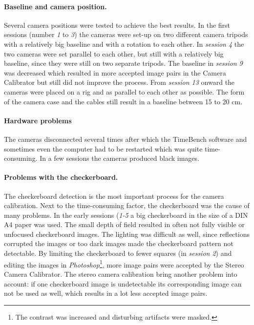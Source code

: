 \paragraph{Baseline and camera position.}
Several camera positions were tested to achieve the best results. In the first sessions (number \textit{1} to \textit{3}) the cameras were set-up on two different camera tripods with a relatively big baseline and with a rotation to each other. In \textit{session 4} the two cameras were set parallel to each other, but still with a relatively big baseline, since they were still on two separate tripods. The baseline in \textit{session 9} was decreased which resulted in more accepted image pairs in the Camera Calibrator but still did not improve the process. From \textit{session 13} onward the cameras were placed on a rig and as parallel to each other as possible. The form of the camera case and the cables still result in a baseline between 15 to 20 cm.

\paragraph{Hardware problems}
The cameras disconnected several times after which the TimeBench software and sometimes even the computer had to be restarted which was quite time-consuming. In a few sessions the cameras produced black images.

\paragraph{Problems with the checkerboard.}
The checkerboard detection is the most important process for the camera calibration. Next to the time-consuming factor, the checkerboard was the cause of many problems. In the early sessions (\textit{1-5} a big checkerboard in the size of a DIN A4 paper was used. The small depth of field resulted in often not fully visible or unfocused checkerboard images. The lighting was difficult as well, since reflections corrupted the images or too dark images made the checkerboard pattern not detectable. By limiting the checkerboard to fewer squares (in \textit{session 2}) and editing the images in \textit{Photoshop}\footnote{The contrast was increased and disturbing artifacts were masked.}, more image pairs were accepted by the Stereo Camera Calibrator. The stereo camera calibration bring another problem into account: if one checkerboard image is undetectable its corresponding image can not be used as well, which results in a lot less accepted image pairs.   

